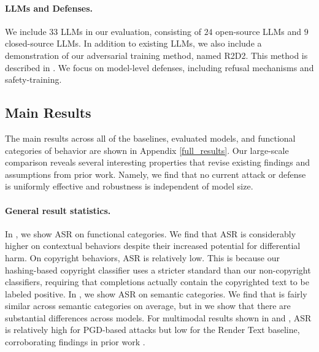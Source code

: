 \paragraph{LLMs and Defenses.}
We include $33$ LLMs in our evaluation, consisting of $24$ open-source LLMs and $9$ closed-source LLMs. In addition to existing LLMs, we also include a demonstration of our adversarial training method, named R2D2. This method is described in . We focus on model-level defenses, including refusal mechanisms and safety-training.

\subsection{Main Results}
The main results across all of the baselines, evaluated models, and functional categories of behavior are shown in Appendix \ref{full_results}.
Our large-scale comparison reveals several interesting properties that revise existing findings and assumptions from prior work. Namely, we find that no current attack or defense is uniformly effective and robustness is independent of model size.

\paragraph{General result statistics.}
In , we show ASR on functional categories. We find that ASR is considerably higher on contextual behaviors despite their increased potential for differential harm. On copyright behaviors, ASR is relatively low. This is because our hashing-based copyright classifier uses a stricter standard than our non-copyright classifiers, requiring that completions actually contain the copyrighted text to be labeled positive. In , we show ASR on semantic categories. We find that is fairly similar across semantic categories on average, but in  we show that there are substantial differences across models. For multimodal results shown in  and , ASR is relatively high for PGD-based attacks but low for the Render Text baseline, corroborating findings in prior work \citep{bagdasaryan2023ab}.

